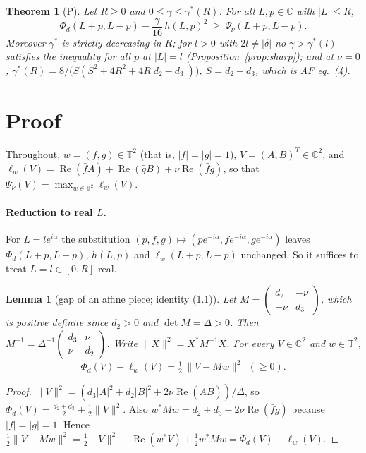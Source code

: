 \documentclass[11pt]{article}
\newtheorem{theorem}{Theorem}
\newtheorem{lemma}{Lemma}
\theoremstyle{remark}
\renewcommand{\Re}{\operatorname{Re}}
\newcommand{\T}{\mathbb{T}}
\newcommand{\C}{\mathbb{C}}
\begin{document}
\begin{theorem}[P]\label{thm:main}
Let $R\ge0$ and $0\le\gamma\le\gamma^*(R)$. For all $L,p\in\C$ with $|L|\le R$,
\[
\Phi_d(L+p,L-p)-\frac{\gamma}{16}\,h(L,p)^2\ \ge\ \Psi_\nu(L+p,L-p).
\]
Moreover $\gamma^*$ is strictly decreasing in $R$; for $l>0$ with $2l\ne|\delta|$ no $\gamma>\gamma^*(l)$ satisfies the
inequality for all $p$ at $|L|=l$ (Proposition~\ref{prop:sharp}); and at $\nu=0$,
$\gamma^*(R)=8/\bigl(S(S^2+4R^2+4R|d_2-d_3|)\bigr)$, $S=d_2+d_3$, which is AF eq.~(4).
\end{theorem}

\section{Proof}

Throughout, $w=(f,g)\in\T^2$ (that is, $|f|=|g|=1$), $V=(A,B)^T\in\C^2$, and $\ell_w(V)=\Re(\bar fA)+\Re(\bar gB)+\nu\Re(\bar fg)$, so
that $\Psi_\nu(V)=\max_{w\in\T^2}\ell_w(V)$.

\paragraph{Reduction to real $L$.} For $L=le^{i\alpha}$ the substitution $(p,f,g)\mapsto(pe^{-i\alpha},fe^{-i\alpha},ge^{-i\alpha})$
leaves $\Phi_d(L+p,L-p)$, $h(L,p)$ and $\ell_w(L+p,L-p)$ unchanged. So it suffices to treat $L=l\in[0,R]$ real.

\begin{lemma}[gap of an affine piece; identity (1.1)]\label{lem:gap}
Let $M=\begin{pmatrix}d_2&-\nu\\-\nu&d_3\end{pmatrix}$, which is positive definite since $d_2>0$ and $\det M=\Delta>0$. Then
$M^{-1}=\Delta^{-1}\begin{pmatrix}d_3&\nu\\\nu&d_2\end{pmatrix}$. Write $\|X\|^2=X^*M^{-1}X$. For every $V\in\C^2$ and $w\in\T^2$,
\[
\Phi_d(V)-\ell_w(V)=\tfrac12\,\|V-Mw\|^2\ \ (\ge0).
\]
\end{lemma}
\begin{proof}
$\|V\|^2=(d_3|A|^2+d_2|B|^2+2\nu\Re(A\bar B))/\Delta$, so $\Phi_d(V)=\frac{d_2+d_3}2+\frac12\|V\|^2$. Also
$w^*Mw=d_2+d_3-2\nu\Re(\bar fg)$ because $|f|=|g|=1$. Hence $\frac12\|V-Mw\|^2=\frac12\|V\|^2-\Re(w^*V)+\frac12w^*Mw
=\Phi_d(V)-\ell_w(V)$.
\end{proof}
\end{document}
